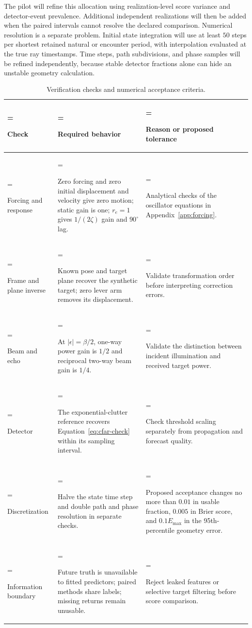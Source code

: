\documentclass[10pt,letterpaper]{article}
\begin{document}
The pilot will refine this allocation using realization-level score variance and detector-event prevalence. Additional independent realizations will then be added when the paired intervals cannot resolve the declared comparison. Numerical resolution is a separate problem. Initial state integration will use at least $50$ steps per shortest retained natural or encounter period, with interpolation evaluated at the true ray timestamps. Time steps, path subdivisions, and phase samples will be refined independently, because stable detector fractions alone can hide an unstable geometry calculation.

\begin{table}[H]
\centering
\caption{Verification checks and numerical acceptance criteria.}
\label{tab:implementation-checks}
\small
\begin{tabularx}{\textwidth}{@{}>{\hsize=0.6\hsize\linewidth=\hsize\raggedright\arraybackslash}X>{\hsize=1.25\hsize\linewidth=\hsize\raggedright\arraybackslash}X>{\hsize=1.15\hsize\linewidth=\hsize\raggedright\arraybackslash}X@{}}
\toprule
Check & Required behavior & Reason or proposed tolerance \\
\midrule
Forcing and response & Zero forcing and zero initial displacement and velocity give zero motion; static gain is one; $r_e=1$ gives $1/(2\zeta)$ gain and $90^\circ$ lag. & Analytical checks of the oscillator equations in Appendix~\ref{app:forcing}. \\
Frame and plane inverse & Known pose and target plane recover the synthetic target; zero lever arm removes its displacement. & Validate transformation order before interpreting correction errors. \\
Beam and echo & At $|\epsilon|=\beta/2$, one-way power gain is $1/2$ and reciprocal two-way beam gain is $1/4$. & Validate the distinction between incident illumination and received target power. \\
Detector & The exponential-clutter reference recovers Equation~\ref{eq:cfar-check} within its sampling interval. & Check threshold scaling separately from propagation and forecast quality. \\
Discretization & Halve the state time step and double path and phase resolution in separate checks. & Proposed acceptance changes no more than $0.01$ in usable fraction, $0.005$ in Brier score, and $0.1E_{\max}$ in the 95th-percentile geometry error. \\
Information boundary & Future truth is unavailable to fitted predictors; paired methods share labels; missing returns remain unusable. & Reject leaked features or selective target filtering before score comparison. \\
\bottomrule
\end{tabularx}
\end{table}
\end{document}
